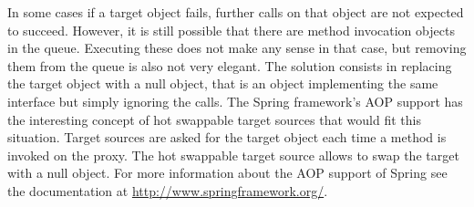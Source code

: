 In some cases if a target object fails, further calls on that object are not
expected to succeed. However, it is still possible that there are method
invocation objects in the queue. Executing these does not make any sense
in that case, but removing them from the queue is also not very elegant.
The solution consists in replacing the target object with a null object, that
is an object implementing the same interface but simply ignoring the calls.
The Spring framework's AOP support has the interesting concept of
hot swappable target sources that would fit this situation. Target sources
are asked for the target object each time a method is invoked on the
proxy. The hot swappable target source allows to swap the target with a
null object. For more information about the AOP support of Spring see
the documentation at 
\href{http://www.springframework.org/}{http://www.springframework.org/}.

